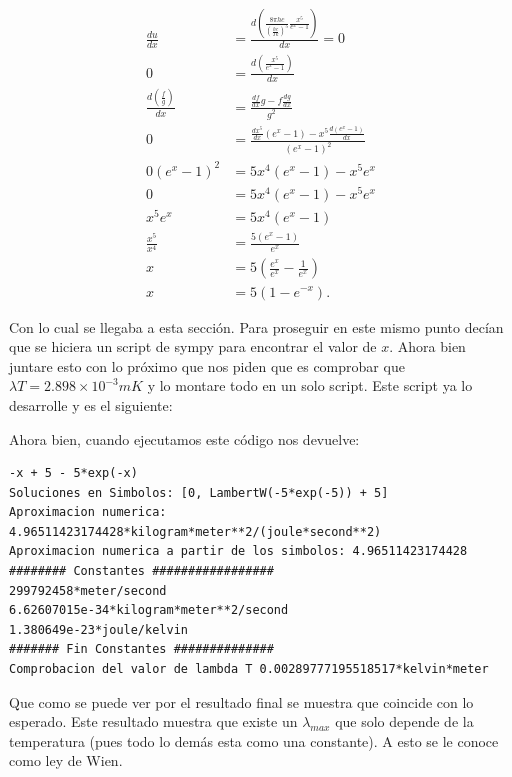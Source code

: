 \documentclass{report}
\begin{document}
\begin{align*}
  \frac{du}{dx} &= \frac{ d\left(\frac{8\pi hc}{\left( \frac{hc}{Tk} \right)^{5}} \frac{x^{5}}{e^{x} - 1} \right)}{dx} = 0 \\
  0 &= \frac{d\left( \frac{x^{5}}{e^{x} - 1} \right) }{dx} \\
  \frac{d\left( \frac{f}{g} \right) }{dx} &= \frac{\frac{df}{dx}g - f \frac{dg}{dx}}{g^2} \\
  0 &= \frac{\frac{dx^{5}}{dx} \left( e^{x} - 1 \right) - x^{5} \frac{d\left( e^{x} - 1\right) }{dx}}{\left( e^{x} - 1 \right)^2}  \\
  0\left( e^{x} - 1 \right)^2 &= 5x^{4}\left( e^{x} - 1 \right) - x^{5}e^{x} \\
  0 &= 5x^{4}\left( e^{x} - 1 \right) - x^{5}e^{x} \\
  x^{5}e^{x} &= 5x^{4}\left( e^{x} - 1 \right)  \\
  \frac{x^{5}}{x^{4}} &= \frac{5\left( e^{x} - 1 \right) }{e^{x}} \\
  x &= 5 \left( \frac{e^{x}}{e^{x}} - \frac{1}{e^{x}} \right)  \\
  x &= 5\left( 1 - e^{-x} \right)
.\end{align*}

Con lo cual se llegaba a esta sección. Para proseguir en este mismo punto decían que se hiciera un script de sympy para encontrar el valor de $x$. Ahora bien juntare esto con lo próximo que nos piden que es comprobar que  $\lambda T = 2.898 \times 10^{-3}mK$ y lo montare todo en un solo script. Este script ya lo desarrolle y es el siguiente:



Ahora bien, cuando ejecutamos este código nos devuelve:
\begin{lstlisting}
-x + 5 - 5*exp(-x)
Soluciones en Simbolos: [0, LambertW(-5*exp(-5)) + 5]
Aproximacion numerica: 4.96511423174428*kilogram*meter**2/(joule*second**2)
Aproximacion numerica a partir de los simbolos: 4.96511423174428
######## Constantes #################
299792458*meter/second
6.62607015e-34*kilogram*meter**2/second
1.380649e-23*joule/kelvin
####### Fin Constantes ##############
Comprobacion del valor de lambda T 0.00289777195518517*kelvin*meter
\end{lstlisting}

Que como se puede ver por el resultado final se muestra que coincide con lo esperado. Este resultado muestra que existe un $\lambda_{max}$ que solo depende de la temperatura (pues todo lo demás esta como una constante). A esto se le conoce como ley de Wien.
\end{document}
